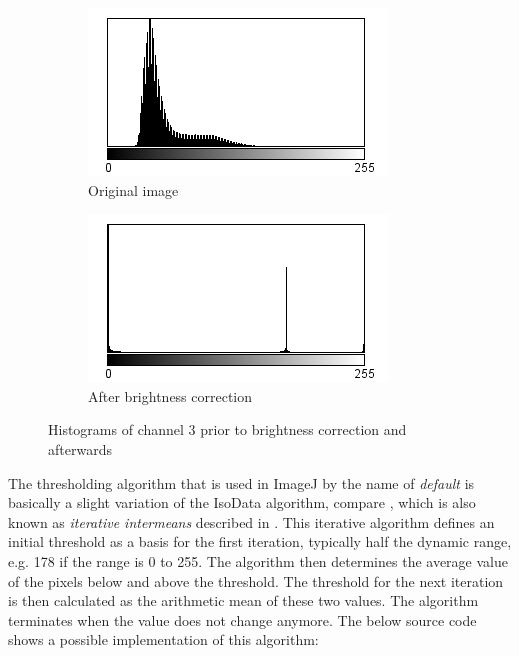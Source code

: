 \documentclass[a4paper, 12pt]{article}
\begin{document}
\begin{figure}[h]
\centering
\begin{subfigure}[b]{0.4\textwidth}
\includegraphics[width=\textwidth]{images/histogram_original}
\caption{Original image}
\end{subfigure}
\quad
\begin{subfigure}[b]{0.4\textwidth}
\includegraphics[width=\textwidth]{images/histogram_brightness_corrected}
\caption{After brightness correction}
\end{subfigure}
\caption{Histograms of channel 3 prior to brightness correction and afterwards}
\label{fig:example_histograms}
\end{figure}

The thresholding algorithm that is used in ImageJ by the name of
\textit{default} is basically a slight variation of the IsoData algorithm,
compare \cite{landini13}, which is also known as \textit{iterative intermeans} described
in \cite{ridler78}. This iterative algorithm defines an initial threshold as a
basis for the first iteration, typically half the dynamic range, e.g. 178 if
the range is 0 to 255. The algorithm then determines the average value of the
pixels below and above the threshold. The threshold for the next iteration is
then calculated as the  arithmetic mean of these two values. The algorithm
terminates when the value does not change anymore. The below source code shows
a possible implementation of this algorithm:
\end{document}
